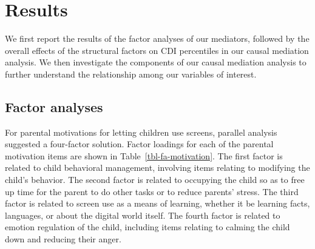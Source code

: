 \documentclass[
  man,
  floatsintext,
  longtable,
  nolmodern,
  notxfonts,
  notimes,
  colorlinks=true,linkcolor=blue,citecolor=blue,urlcolor=blue]{apa7}
\begin{document}
\section{Results}\label{results}

We first report the results of the factor analyses of our mediators,
followed by the overall effects of the structural factors on CDI
percentiles in our causal mediation analysis. We then investigate the
components of our causal mediation analysis to further understand the
relationship among our variables of interest.

\subsection{Factor analyses}\label{factor-analyses}

For parental motivations for letting children use screens, parallel
analysis suggested a four-factor solution. Factor loadings for each of
the parental motivation items are shown in
Table~\ref{tbl-fa-motivation}. The first factor is related to child
behavioral management, involving items relating to modifying the child's
behavior. The second factor is related to occupying the child so as to
free up time for the parent to do other tasks or to reduce parents'
stress. The third factor is related to screen use as a means of
learning, whether it be learning facts, languages, or about the digital
world itself. The fourth factor is related to emotion regulation of the
child, including items relating to calming the child down and reducing
their anger.
\end{document}
